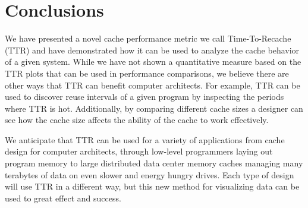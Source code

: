 \section{Conclusions}

We have presented a novel cache performance metric we call 
Time-To-Recache (TTR) and have demonstrated how it can be used to 
analyze the cache behavior of a given system. 
While we have not shown a quantitative measure based on the TTR plots 
that can be used in performance comparisons, we believe there are other
ways that TTR can benefit computer architects. 
For example, TTR can be used to discover reuse intervals of a given
program by inspecting the periods where TTR is hot.
Additionally, by comparing different cache sizes a designer can see
how the cache size affects the ability of the cache to work effectively.

We anticipate that TTR can be used for a variety of applications from cache
design for computer architects, through low-level programmers laying out 
program memory to large distributed data center memory caches managing
many terabytes of data on even slower and energy hungry drives.
Each type of design will use TTR in a different way, but this new method 
for visualizing data can be used to great effect and success.
